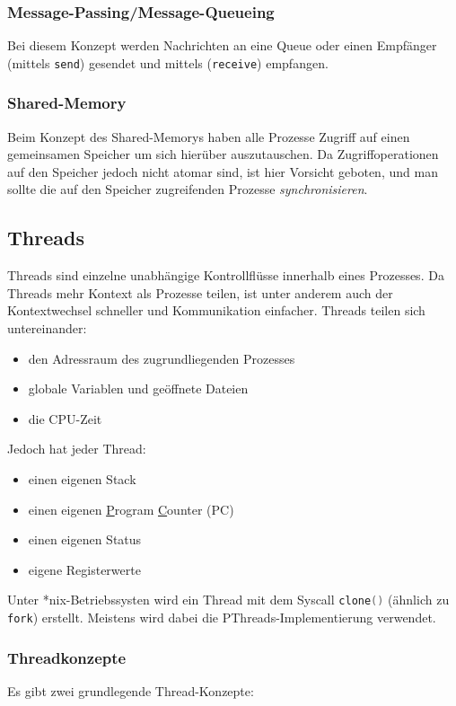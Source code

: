\documentclass[11pt]{scrartcl}
\begin{document}
\subsubsection{Message-Passing/Message-Queueing}
Bei diesem Konzept werden Nachrichten an eine Queue oder einen Empfänger (mittels \texttt{send}) gesendet und mittels (\texttt{receive}) empfangen. %

\subsubsection{Shared-Memory}
Beim Konzept des Shared-Memorys haben alle Prozesse Zugriff auf einen gemeinsamen Speicher um sich hierüber auszutauschen. Da Zugriffoperationen auf den Speicher jedoch nicht atomar sind, ist hier Vorsicht geboten, und man sollte die auf den Speicher zugreifenden Prozesse \textit{synchronisieren}.

\subsection{Threads}
Threads sind einzelne unabhängige Kontrollflüsse innerhalb eines Prozesses. Da Threads mehr Kontext als Prozesse teilen, ist unter anderem auch der Kontextwechsel schneller und Kommunikation einfacher. Threads teilen sich untereinander:

\begin{itemize}
\item{den Adressraum des zugrundliegenden Prozesses}
\item{globale Variablen und geöffnete Dateien}
\item{die CPU-Zeit}
\end{itemize}

Jedoch hat jeder Thread:

\begin{itemize}
\item{einen eigenen Stack}
\item{einen eigenen \underline Program \underline Counter (PC)}
\item{einen eigenen Status}
\item{eigene Registerwerte}
\end{itemize}

Unter *nix-Betriebssysten wird ein Thread mit dem Syscall \lstinline[language=C]!clone()! (ähnlich zu \lstinline!fork!) erstellt. Meistens wird dabei die PThreads-Implementierung verwendet.

\subsubsection{Threadkonzepte}
Es gibt zwei grundlegende Thread-Konzepte:
\end{document}
